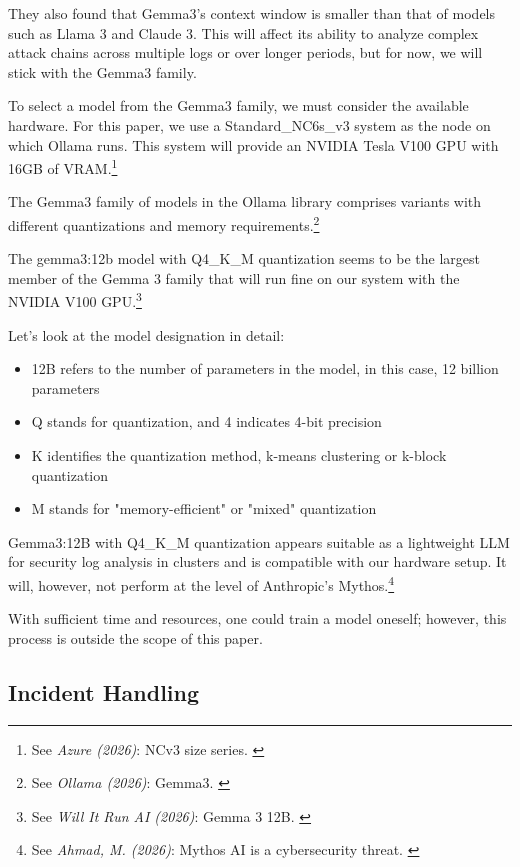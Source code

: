 They also found that Gemma3's context window is smaller than that of models such as Llama 3 and Claude 3. This will affect its ability to analyze complex attack chains across multiple logs or over longer periods, but for now, we will stick with the Gemma3 family.

To select a model from the Gemma3 family, we must consider the available hardware. For this paper, we use a Standard\_NC6s\_v3 system as the node on which Ollama runs. This system will provide an NVIDIA Tesla V100 GPU with 16GB of VRAM.\footnote{See \textit{Azure (2026)}: NCv3 size series. \cite{ncv3Series}}

The Gemma3 family of models in the Ollama library comprises variants with different quantizations and memory requirements.\footnote{See \textit{Ollama (2026)}: Gemma3. \cite{modelsGemma3}}

The gemma3:12b model with Q4\_K\_M quantization seems to be the largest member of the Gemma 3 family that will run fine on our system with the NVIDIA V100 GPU.\footnote{See \textit{Will It Run AI (2026)}: Gemma 3 12B. \cite{nvidiaV100}}

Let's look at the model designation in detail:

\begin{itemize}
    \item 12B refers to the number of parameters in the model, in this case, 12 billion parameters 
    \item Q stands for quantization, and 4 indicates 4-bit precision
    \item K identifies the quantization method, k-means clustering or k-block quantization
    \item M stands for "memory-efficient" or "mixed" quantization
\end{itemize}

Gemma3:12B with Q4\_K\_M quantization appears suitable as a lightweight LLM for security log analysis in clusters and is compatible with our hardware setup. It will, however, not perform at the level of Anthropic's Mythos.\footnote{See \textit{Ahmad, M. (2026)}: Mythos AI is a cybersecurity threat. \cite{mythosThreat}}

With sufficient time and resources, one could train a model oneself; however, this process is outside the scope of this paper.

\subsection{Incident Handling}

